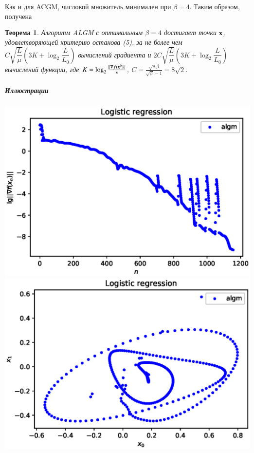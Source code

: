 \documentclass{crm-article}
\newtheorem{theorems}{Теорема}
\begin{document}
Как и для ACGM, числовой множитель минимален при $\beta=4$.
Таким образом, получена
\begin{theorems}
Алгоритм ALGM с оптимальным $\beta=4$ достигает точки ${\bf x}$, удовлетворяющей критерию останова (5), за не более чем $C \sqrt{\dfrac{L}{\mu}} \left(3K+\log_2\dfrac{L}{L_0}\right)$ вычислений градиента и $2C \sqrt{\dfrac{L}{\mu}} \left(3K+\log_2\dfrac{L}{L_0}\right)$ вычислений функции, где $K=\log_2\frac{||\nabla f({\bf x}^0)||}{\varepsilon}$, $C=\frac{\sqrt{8}\beta}{\sqrt{\beta}-1}=8\sqrt{2}$.
\end{theorems}

\subparagraph{Иллюстрации}

\noindent
\includegraphics[scale=0.5]{plots/ill_algm_logr_des.eps}
\includegraphics[scale=0.5]{plots/xy_algm_logr_des.eps}
\end{document}
